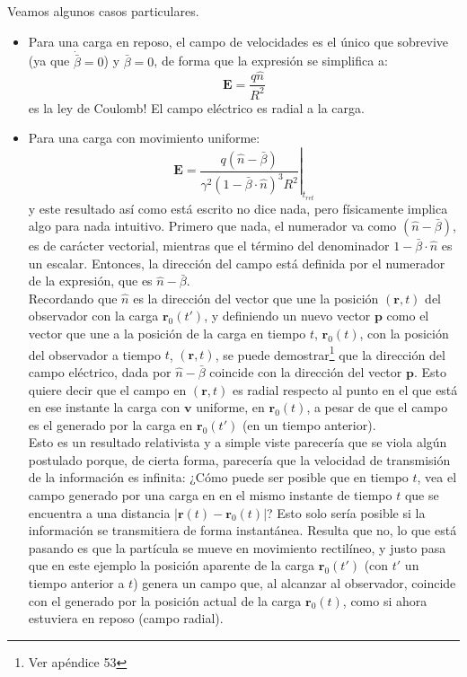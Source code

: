 \indent Veamos algunos casos particulares.
\begin{itemize}
    \item Para una carga en reposo, el campo de velocidades es el único que sobrevive (ya que $\dot{\bar{\beta}} = 0$) y $\bar{\beta} = 0$, de forma que la expresión se simplifica a:
    \begin{equation*}
        \textbf{E} = \frac{q\hat{n}}{R^{2}}
    \end{equation*}
    es la ley de Coulomb! El campo eléctrico es radial a la carga.
    \item Para una carga con movimiento uniforme:
    \begin{equation*}
        \textbf{E} = 
        \left.
            \frac
            {
                q
                (\hat{n} - \bar{\beta})
            }
            {
                \gamma^{2}(1-\bar{\beta}\cdot\hat{n})^{3}R^{2}
            }
        \right|_{t_{ret}}
    \end{equation*}
    y este resultado así como está escrito no dice nada, pero físicamente implica algo para nada intuitivo. Primero que nada, el numerador va como $(\hat{n} - \bar{\beta})$, es de carácter vectorial, mientras que el término del denominador $1 - \bar{\beta}\cdot\hat{n}$ es un escalar. Entonces, la dirección del campo está definida por el numerador de la expresión, que es $\hat{n} - \bar{\beta}$.\\
    \indent Recordando que $\hat{n}$ es la dirección del vector que une la posición $(\textbf{r},t)$ del observador con la carga $\textbf{r}_{0}(t')$, y definiendo un nuevo vector $\textbf{p}$ como el vector que une a la posición de la carga en tiempo $t$, $\textbf{r}_{0}(t)$, con la posición del observador a tiempo $t$, $(\textbf{r}, t)$, se puede demostrar\footnote{Ver apéndice 53} que la dirección del campo eléctrico, dada por $\hat{n} - \bar{\beta}$ coincide con la dirección del vector $\textbf{p}$. Esto quiere decir que el campo en $(\textbf{r},t)$ es radial respecto al punto en el que está en ese instante la carga con $\textbf{v}$ uniforme, en $\textbf{r}_{0}(t)$, a pesar de que el campo es el generado por la carga en $\textbf{r}_{0}(t')$ (en un tiempo anterior).\\
    \indent Esto es un resultado relativista y a simple viste parecería que se viola algún postulado porque, de cierta forma, parecería que la velocidad de transmisión de la información es infinita: ¿Cómo puede ser posible que en tiempo $t$, vea el campo generado por una carga en en el mismo instante de tiempo $t$ que se encuentra a una distancia $|\textbf{r}(t) - \textbf{r}_{0}(t)|$? Esto solo sería posible si la información se transmitiera de forma instantánea. Resulta que no, lo que está pasando es que la partícula se mueve en movimiento rectilíneo, y justo pasa que en este ejemplo la posición aparente de la carga $\textbf{r}_{0}(t')$ (con $t'$ un tiempo anterior a $t$) genera un campo que, al alcanzar al observador, coincide con el generado por la posición actual de la carga $\textbf{r}_{0}(t)$, como si ahora estuviera en reposo (campo radial).\\

\end{itemize}
